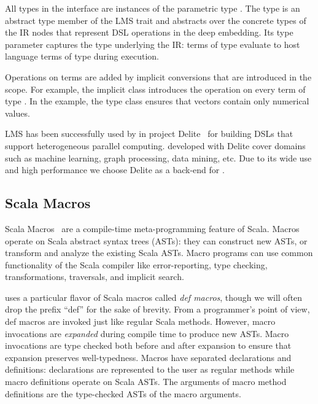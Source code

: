 All types in the  interface are instances of the
parametric type .  The  type is an abstract
type member of the  LMS trait and abstracts over the
concrete types of the IR nodes that represent DSL operations in the
deep embedding.  Its type parameter captures the type underlying the
IR: \edsl terms of type  evaluate to host language terms
of type  during \edsl execution.

Operations on  terms are added by implicit conversions that are introduced in the \edsl scope. For example, the implicit class  introduces the \code{+} operation on every term of type . In the example, the type class  ensures that vectors contain only numerical values.

LMS has been successfully used by in project Delite~\cite{brown_heterogeneous_2011,composition-ecoop2013} for building DSLs that support heterogeneous parallel computing. \edsls developed with Delite cover domains
such as machine learning, graph processing, data mining, etc. Due to its wide use and high performance we choose Delite as a back-end for \tool.


\subsection{Scala Macros}
\label{sec:scala-macros}

Scala Macros~\cite{burmako_scala_2013} are a compile-time meta-programming
feature of Scala. Macros operate on Scala abstract syntax trees (ASTs): they
can construct new ASTs, or transform and analyze the existing Scala ASTs.
Macro programs can use common functionality of the Scala compiler like
error-reporting, type checking, transformations, traversals, and implicit
search.

\tool uses a particular flavor of Scala macros called \emph{def
  macros}, though we will often drop the prefix ``def'' for the
sake of brevity.  From a programmer's point of view, def macros
are invoked just like regular Scala methods.  However, macro
invocations are \emph{expanded} during compile time to produce new
ASTs.  Macro invocations are type checked both before and after
expansion to ensure that expansion preserves well-typedness.  Macros
have separated declarations and definitions: declarations are
represented to the user as regular methods while macro definitions
operate on Scala ASTs.  The arguments of macro method definitions are
the type-checked ASTs of the macro arguments.

